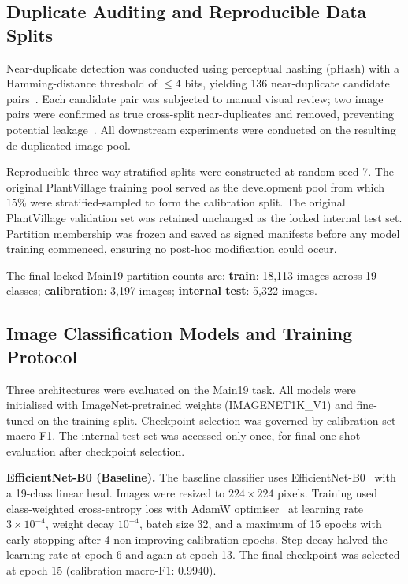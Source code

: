 \documentclass[conference]{IEEEtran}
\begin{document}
\subsection{Duplicate Auditing and Reproducible Data Splits}

Near-duplicate detection was conducted using perceptual hashing (pHash) with a
Hamming-distance threshold of $\leq$4 bits, yielding 136 near-duplicate
candidate pairs~\cite{zauner2010implementation}. Each candidate pair was
subjected to manual visual review; two image pairs were confirmed as true
cross-split near-duplicates and removed, preventing potential
leakage~\cite{barz2020we,northcutt2021pervasive}. All downstream experiments
were conducted on the resulting de-duplicated image pool.

Reproducible three-way stratified splits were constructed at random seed 7.
The original PlantVillage training pool served as the development pool from
which 15\% were stratified-sampled to form the calibration split. The original
PlantVillage validation set was retained unchanged as the locked internal test
set. Partition membership was frozen and saved as signed manifests before any
model training commenced, ensuring no post-hoc modification could occur.

The final locked Main19 partition counts are:
\textbf{train}: 18,113 images across 19 classes;
\textbf{calibration}: 3,197 images;
\textbf{internal test}: 5,322 images.

\subsection{Image Classification Models and Training Protocol}

Three architectures were evaluated on the Main19 task. All models were
initialised with ImageNet-pretrained weights (IMAGENET1K\_V1) and fine-tuned
on the training split. Checkpoint selection was governed by calibration-set
macro-F1. The internal test set was accessed only once, for final one-shot
evaluation after checkpoint selection.

\textbf{EfficientNet-B0 (Baseline).}
The baseline classifier uses EfficientNet-B0~\cite{tan2019efficientnet}
with a 19-class linear head. Images were resized to $224\times224$ pixels.
Training used class-weighted cross-entropy loss with AdamW
optimiser~\cite{loshchilov2017decoupled} at learning rate $3\times10^{-4}$,
weight decay $10^{-4}$, batch size 32, and a maximum of 15 epochs with early
stopping after 4 non-improving calibration epochs. Step-decay halved the
learning rate at epoch 6 and again at epoch 13. The final checkpoint was
selected at epoch 15 (calibration macro-F1: 0.9940).
\end{document}
